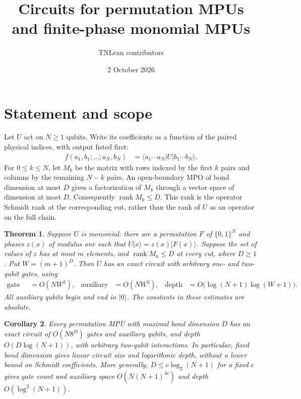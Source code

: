 \documentclass[11pt]{article}
\title{Circuits for permutation MPUs and finite-phase monomial MPUs}
\author{TNLean contributors}
\date{2 October 2026}
\newtheorem{theorem}{Theorem}
\newtheorem{corollary}[theorem]{Corollary}
\begin{document}
\maketitle

\section{Statement and scope}

Let $U$ act on $N\geq1$ qubits. Write its coefficients as a function of the
paired physical indices, with output listed first:
\begin{align}
 f(a_1,b_1;\ldots;a_N,b_N)
 &=\langle a_1\cdots a_N|U|b_1\cdots b_N\rangle.
 \label{eq:coefficients}
\end{align}
For $0\leq k\leq N$, let $M_k$ be the matrix with rows indexed by the
first $k$ pairs and columns by the remaining $N-k$ pairs. An open-boundary
MPO of bond dimension at most $D$ gives a factorization of $M_k$ through a
vector space of dimension at most $D$. Consequently $\operatorname{rank}M_k\leq D$.
This rank is the operator Schmidt rank at the corresponding cut, rather
than the rank of $U$ as an operator on the full chain.

\begin{theorem}\label{thm:monomial}
Suppose $U$ is monomial: there are a permutation $F$ of $\{0,1\}^N$ and
phases $z(x)$ of modulus one such that $U|x\rangle=z(x)|F(x)\rangle$.
Suppose the set of values of $z$ has at most $m$ elements, and
$\operatorname{rank}M_k\leq D$ at every cut, where $D\geq1$.
Put $W=(m+1)^D$. Then $U$ has an exact circuit with arbitrary one- and
two-qubit gates, using
\begin{align}
 \text{gate count}&=O(NW^3),&
 \text{auxiliary qubits}&=O(NW^3),&
 \text{depth}&=O\bigl(\log(N+1)\log(W+1)\bigr).
 \label{eq:resources}
\end{align}
All auxiliary qubits begin and end in $|0\rangle$.
The constants in these estimates are absolute.
\end{theorem}

\begin{corollary}\label{cor:permutation}
Every permutation MPU with maximal bond dimension $D$ has an exact circuit
of $O(N8^D)$ gates and auxiliary qubits, and depth
$O(D\log(N+1))$, with arbitrary two-qubit interactions.
In particular, fixed bond dimension gives linear circuit size and
logarithmic depth, without a lower bound on Schmidt coefficients.
More generally, $D\leq c\log_2(N+1)$ for a fixed $c$ gives gate count and
auxiliary space $O(N(N+1)^{3c})$ and depth $O(\log^2(N+1))$.
\end{corollary}
\end{document}
